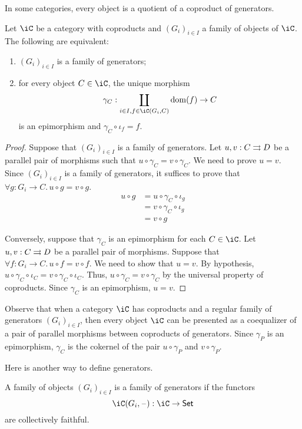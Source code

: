 \documentclass{amsart}
\begin{document}
In some categories, every object is a quotient of a coproduct of generators.
\begin{prop}
  Let $\iC$ be a category with coproducts and $(G_{i})_{i \in I}$ a family of objects of $\iC$.
  The following are equivalent:
  \begin{enumerate}
  \item $(G_{i})_{i \in I}$ is a family of generators;
  \item for every object $C \in \iC$, the unique morphism
    \[
      \gamma_{C} : \coprod_{i \in I, f \in \iC(G_{i}, C)} \dom(f) \to C
    \]
    is an epimorphism and $\gamma_{C} \circ \iota_{f} = f$.
  \end{enumerate}
\end{prop}
\begin{proof}
  Suppose that $(G_{i})_{i \in I}$ is a family of generators.
  Let $u,v : C \rightrightarrows D$ be a parallel pair of morphisms such that $u \circ \gamma_{C} = v \circ \gamma_{C}$.
  We need to prove $u = v$.
  Since $(G_{i})_{i \in I}$ is a family of generators, it suffices to prove that $\forall g : G_{i} \to C.\,u \circ g = v \circ g$.
  \begin{align}
    u \circ g &= u \circ \gamma_{C} \circ \iota_{g}\\
          &= v \circ \gamma_{C} \circ \iota_{g}\\
          &= v \circ g
  \end{align}

  Conversely, suppose that $\gamma_{C}$ is an epimorphism for each $C \in \iC$.
  Let $u,v : C \rightrightarrows D$ be a parallel pair of morphisms.
  Suppose that $\forall f : G_{i} \to C.\, u \circ f = v \circ f$.
  We need to show that $u = v$.
  By hypothesis, $u \circ \gamma_{C} \circ \iota_{C} = v \circ \gamma_{C} \circ \iota_{C}$.
  Thus, $u \circ \gamma_{C} = v \circ \gamma_{C}$ by the universal property of coproducts.
  Since $\gamma_{C}$ is an epimorphism, $u = v$.
\end{proof}

Observe that when a category $\iC$ has coproducts and a regular family of generators $(G_{i})_{i \in I}$, then every object $\iC$ can be presented as a coequalizer of a pair of parallel morphisms between coproducts of generators.
Since $\gamma_{P}$ is an epimorphism, $\gamma_{C}$ is the cokernel of the pair $u \circ \gamma_{P}$ and $v \circ \gamma_{P}$.
\[\]

Here is another way to define generators.
\begin{defn}
  A family of objects $(G_{i})_{i \in I}$ is a family of generators if the functors
  \[
    \iC(G_{i}, \blank) : \iC \to \mathsf{Set}
  \]
  are collectively faithful.
\end{defn}
\end{document}
